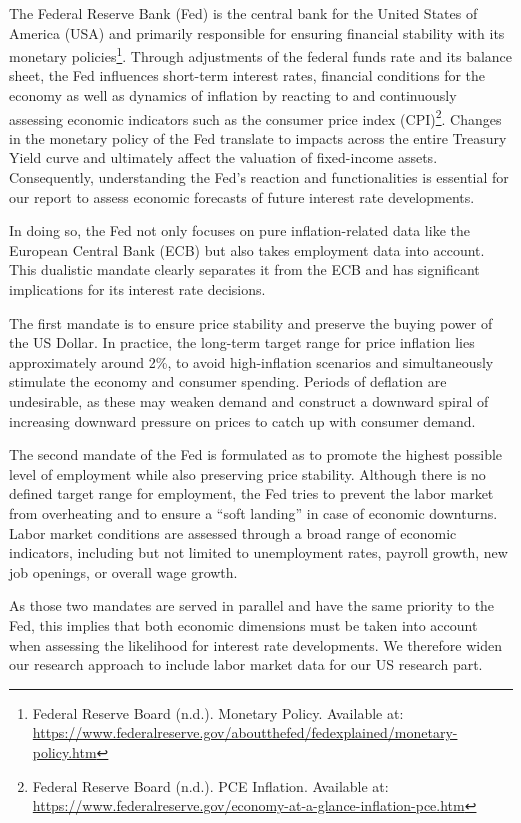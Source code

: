 \documentclass[11pt,a4paper]{article}
\begin{document}
The Federal Reserve Bank (Fed) is the central bank for the United States of America (USA) and primarily responsible for ensuring financial stability with its monetary policies\footnote{Federal Reserve Board (n.d.). Monetary Policy. Available at: \url{https://www.federalreserve.gov/aboutthefed/fedexplained/monetary-policy.htm}}. Through adjustments of the federal funds rate and its balance sheet, the Fed influences short-term interest rates, financial conditions for the economy as well as dynamics of inflation by reacting to and continuously assessing economic indicators such as the consumer price index (CPI)\footnote{Federal Reserve Board (n.d.). PCE Inflation. Available at: \url{https://www.federalreserve.gov/economy-at-a-glance-inflation-pce.htm}}. Changes in the monetary policy of the Fed translate to impacts across the entire Treasury Yield curve and ultimately affect the valuation of fixed-income assets. Consequently, understanding the Fed's reaction and functionalities is essential for our report to assess economic forecasts of future interest rate developments.

In doing so, the Fed not only focuses on pure inflation-related data like the European Central Bank (ECB) but also takes employment data into account. This dualistic mandate clearly separates it from the ECB and has significant implications for its interest rate decisions.

The first mandate is to ensure price stability and preserve the buying power of the US Dollar. In practice, the long-term target range for price inflation lies approximately around 2\%, to avoid high-inflation scenarios and simultaneously stimulate the economy and consumer spending. Periods of deflation are undesirable, as these may weaken demand and construct a downward spiral of increasing downward pressure on prices to catch up with consumer demand.

The second mandate of the Fed is formulated as to promote the highest possible level of employment while also preserving price stability. Although there is no defined target range for employment, the Fed tries to prevent the labor market from overheating and to ensure a ``soft landing'' in case of economic downturns. Labor market conditions are assessed through a broad range of economic indicators, including but not limited to unemployment rates, payroll growth, new job openings, or overall wage growth.

As those two mandates are served in parallel and have the same priority to the Fed, this implies that both economic dimensions must be taken into account when assessing the likelihood for interest rate developments. We therefore widen our research approach to include labor market data for our US research part.
\end{document}
